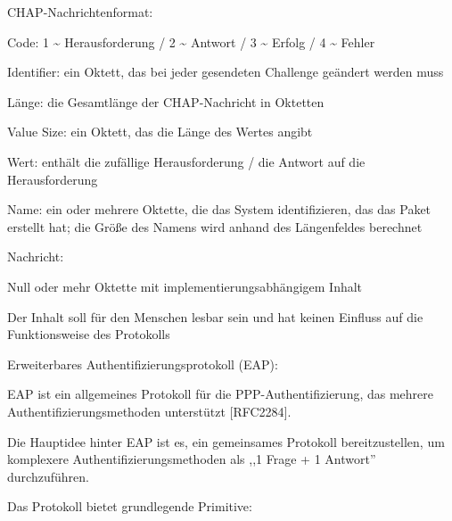 \documentclass[a4paper]{article}
\begin{document}
\begin{multicols}{3}
\begin{itemize*}
\begin{itemize*}
            \end{itemize*}
            \item CHAP-Nachrichtenformat:
            \begin{itemize*}
                  \item Code: 1 \textasciitilde{} Herausforderung / 2 \textasciitilde{} Antwort / 3 \textasciitilde{} Erfolg / 4 \textasciitilde{} Fehler
                  \item Identifier: ein Oktett, das bei jeder gesendeten Challenge geändert werden muss
                  \item Länge: die Gesamtlänge der CHAP-Nachricht in Oktetten
                  \item Value Size: ein Oktett, das die Länge des Wertes angibt
                  \item Wert: enthält die zufällige Herausforderung / die Antwort auf die Herausforderung
                  \item Name: ein oder mehrere Oktette, die das System identifizieren, das das Paket erstellt hat; die Größe des Namens wird anhand des Längenfeldes berechnet
                  \item Nachricht:
                  \begin{itemize*} \item Null oder mehr Oktette mit implementierungsabhängigem Inhalt \item Der Inhalt soll für den Menschen lesbar sein und hat keinen Einfluss auf die Funktionsweise des Protokolls \end{itemize*}
            \end{itemize*}
            \item Erweiterbares Authentifizierungsprotokoll (EAP):
            \begin{itemize*}
                  \item EAP ist ein allgemeines Protokoll für die PPP-Authentifizierung, das mehrere Authentifizierungsmethoden unterstützt {[}RFC2284{]}.
                  \item Die Hauptidee hinter EAP ist es, ein gemeinsames Protokoll bereitzustellen, um komplexere Authentifizierungsmethoden als ,,1 Frage + 1 Antwort'' durchzuführen.
                  \item Das Protokoll bietet grundlegende Primitive:

\end{itemize*}
\end{itemize*}
\end{multicols}
\end{document}
